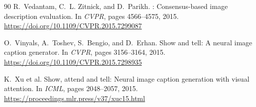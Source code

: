 \documentclass{article}
\begin{document}
\begin{thebibliography}{90}
R.~Vedantam, C.~L. Zitnick, and D.~Parikh.
: Consensus-based image description evaluation.
\newblock In \emph{CVPR}, pages 4566--4575, 2015.
\newblock \url{https://doi.org/10.1109/CVPR.2015.7299087}

O.~Vinyals, A.~Toshev, S.~Bengio, and D.~Erhan.
\newblock Show and tell: A neural image caption generator.
\newblock In \emph{CVPR}, pages 3156--3164, 2015.
\newblock \url{https://doi.org/10.1109/CVPR.2015.7298935}

K.~Xu et al.
\newblock Show, attend and tell: Neural image caption generation with visual
  attention.
\newblock In \emph{ICML}, pages 2048--2057, 2015.
\newblock \url{https://proceedings.mlr.press/v37/xuc15.html}

\end{thebibliography}
\end{document}
